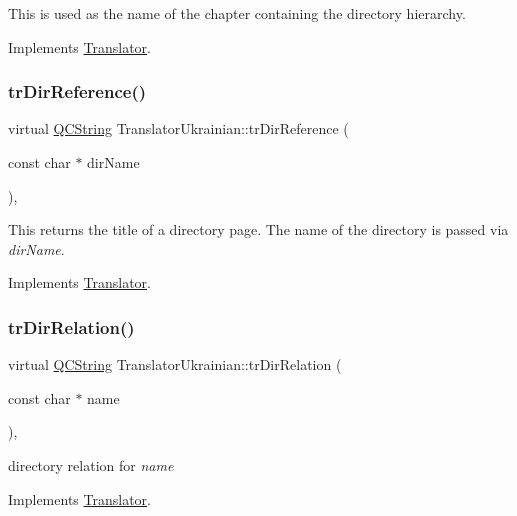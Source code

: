 This is used as the name of the chapter containing the directory hierarchy. 

Implements \mbox{\hyperlink{class_translator}{Translator}}.

\mbox{\label{class_translator_ukrainian_ab72a2205f1684a9a9b5907c52a3e7eff}} 
\subsubsection{\texorpdfstring{trDirReference()}{trDirReference()}}
{\footnotesize\ttfamily virtual \mbox{\hyperlink{class_q_c_string}{Q\+C\+String}} Translator\+Ukrainian\+::tr\+Dir\+Reference (\begin{DoxyParamCaption}\item[{const char $\ast$}]{dir\+Name }\end{DoxyParamCaption})\hspace{0.3cm}{\ttfamily [inline]}, {\ttfamily [virtual]}}

This returns the title of a directory page. The name of the directory is passed via {\itshape dir\+Name}. 

Implements \mbox{\hyperlink{class_translator}{Translator}}.

\mbox{\label{class_translator_ukrainian_af8612895cd337b0ebf614692626183c0}} 
\subsubsection{\texorpdfstring{trDirRelation()}{trDirRelation()}}
{\footnotesize\ttfamily virtual \mbox{\hyperlink{class_q_c_string}{Q\+C\+String}} Translator\+Ukrainian\+::tr\+Dir\+Relation (\begin{DoxyParamCaption}\item[{const char $\ast$}]{name }\end{DoxyParamCaption})\hspace{0.3cm}{\ttfamily [inline]}, {\ttfamily [virtual]}}

directory relation for {\itshape name} 

Implements \mbox{\hyperlink{class_translator}{Translator}}.

